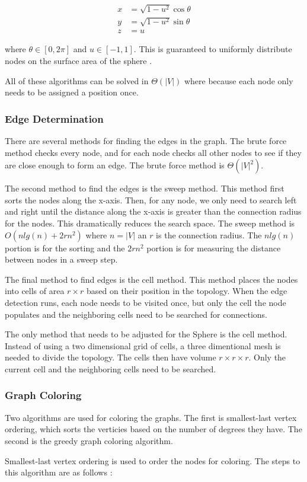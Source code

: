 \documentclass{article}
\begin{document}
        \begin{align}
            x &= \sqrt{1-u^2}\cos\theta \\
            y &= \sqrt{1-u^2}\sin\theta \\
            z &= u
        \end{align}

        where $\theta \in [0,2\pi]$ and $u \in [-1,1]$. This is guaranteed to uniformly distribute nodes on the surface area of the sphere \cite{spherepoints}.
        \par
        All of these algorithms can be solved in $\Theta\left(|V|\right)$ where because each node only needs to be assigned a position once.

        \subsubsection{Edge Determination}
        There are several methods for finding the edges in the graph. The brute force method checks every node, and for each node checks all other nodes to see if they are close enough to form an edge. The brute force method is $\Theta\left(|V|^2\right)$.
        \par
        The second method to find the edges is the sweep method. This method first sorts the nodes along the x-axis. Then, for any node, we only need to search left and right until the distance along the x-axis is greater than the connection radius for the nodes. This dramatically reduces the search space. The sweep method is $O\left(n lg(n) + 2rn^2\right)$ where $n = |V|$ an $r$ is the connection radius. The $n lg(n)$ portion is for the sorting and the $2rn^2$ portion is for measuring the distance between nodes in a sweep step.
        \par
        The final method to find edges is the cell method. This method places the nodes into cells of area $r \times r$ based on their position in the topology. When the edge detection runs, each node needs to be visited once, but only the cell the node populates and the neighboring cells need to be searched for connections.
        \par
        The only method that needs to be adjusted for the Sphere is the cell method. Instead of using a two dimensional grid of cells, a three dimentional mesh is needed to divide the topology. The cells then have volume $r \times r \times r$. Only the current cell and the neighboring cells need to be searched.

        \subsubsection{Graph Coloring}
        Two algorithms are used for coloring the graphs. The first is smallest-last vertex ordering, which sorts the verticies based on the number of degrees they have. The second is the greedy graph coloring algorithm.
        \par
        Smallest-last vertex ordering is used to order the nodes for coloring. The steps to this algorithm are as follows \cite{slv}:
\end{document}
